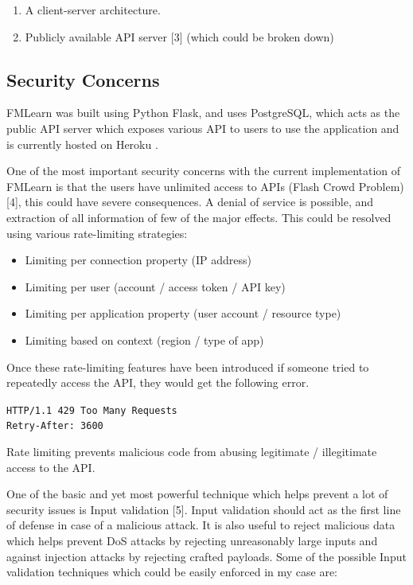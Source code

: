 \begin{enumerate}
    \item A client-server architecture.
    \item Publicly available API server [3] (which could be broken down)
\end{enumerate}

\subsection{Security Concerns}

FMLearn was built using Python Flask, and uses PostgreSQL, which acts as the public API server which exposes various API to users to use the application and is currently hosted on Heroku .

One of the most important security concerns with the current implementation of FMLearn is that the users have unlimited access to APIs (Flash Crowd Problem) [4], this could have severe consequences. A denial of service is possible, and extraction of all information of few of the major effects. This could be resolved using various rate-limiting strategies:

\begin{itemize} 
    \item Limiting per connection property (IP address)
    \item Limiting per user (account / access token / API key)
    \item Limiting per application property (user account / resource type)
    \item Limiting based on context (region / type of app)
\end{itemize}

Once these rate-limiting features have been introduced if someone tried to repeatedly access the API, they would get the following error.

\quad\quad\quad\quad\quad\quad\quad\quad\quad\quad\quad\quad\quad
\texttt{HTTP/1.1 429 Too Many Requests}\\
\quad\quad\quad\quad\quad\quad\quad\quad\quad\quad\quad\quad\quad
\texttt{Retry-After: 3600}


Rate limiting prevents malicious code from abusing legitimate / illegitimate access to the API.

One of the basic and yet most powerful technique which helps prevent a lot of security issues is Input validation [5]. Input validation should act as the first line of defense in case of a malicious attack. It is also useful to reject malicious data which helps prevent DoS attacks by rejecting unreasonably large inputs and against injection attacks by rejecting crafted payloads. Some of the possible Input validation techniques which could be easily enforced in my case are:

